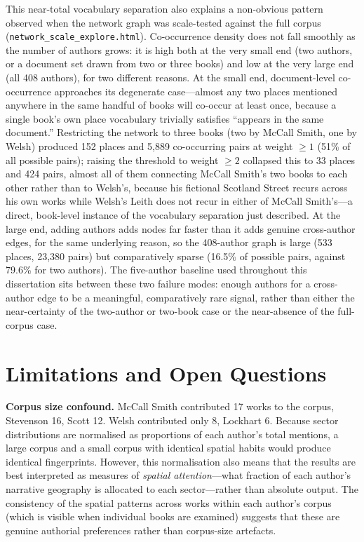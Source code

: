 \documentclass[logo,msc]{infthesis}
\begin{document}
This near-total vocabulary separation also explains a non-obvious pattern observed when the network graph was scale-tested against the full corpus (\texttt{network\_scale\_explore.html}). Co-occurrence density does not fall smoothly as the number of authors grows: it is high both at the very small end (two authors, or a document set drawn from two or three books) and low at the very large end (all 408 authors), for two different reasons. At the small end, document-level co-occurrence approaches its degenerate case---almost any two places mentioned anywhere in the same handful of books will co-occur at least once, because a single book's own place vocabulary trivially satisfies ``appears in the same document.'' Restricting the network to three books (two by McCall Smith, one by Welsh) produced 152 places and 5,889 co-occurring pairs at weight $\geq 1$ (51\% of all possible pairs); raising the threshold to weight $\geq 2$ collapsed this to 33 places and 424 pairs, almost all of them connecting McCall Smith's two books to each other rather than to Welsh's, because his fictional Scotland Street recurs across his own works while Welsh's Leith does not recur in either of McCall Smith's---a direct, book-level instance of the vocabulary separation just described. At the large end, adding authors adds nodes far faster than it adds genuine cross-author edges, for the same underlying reason, so the 408-author graph is large (533 places, 23,380 pairs) but comparatively sparse (16.5\% of possible pairs, against 79.6\% for two authors). The five-author baseline used throughout this dissertation sits between these two failure modes: enough authors for a cross-author edge to be a meaningful, comparatively rare signal, rather than either the near-certainty of the two-author or two-book case or the near-absence of the full-corpus case.
 
\section{Limitations and Open Questions}
 
\textbf{Corpus size confound.} McCall Smith contributed 17 works to the corpus, Stevenson 16, Scott 12. Welsh contributed only 8, Lockhart 6. Because sector distributions are normalised as proportions of each author's total mentions, a large corpus and a small corpus with identical spatial habits would produce identical fingerprints. However, this normalisation also means that the results are best interpreted as measures of \emph{spatial attention}---what fraction of each author's narrative geography is allocated to each sector---rather than absolute output. The consistency of the spatial patterns across works within each author's corpus (which is visible when individual books are examined) suggests that these are genuine authorial preferences rather than corpus-size artefacts.
 
\end{document}
